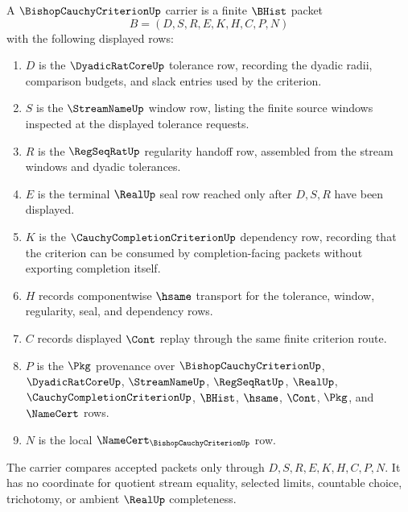 \begin{definition}
\label{def:bishop-cauchy-criterion-carrier}
A $\BishopCauchyCriterionUp$ carrier is a finite $\BHist$ packet
$$
B=(D,S,R,E,K,H,C,P,N)
$$
with the following displayed rows:
\begin{enumerate}
\item $D$ is the $\DyadicRatCoreUp$ tolerance row, recording the dyadic radii, comparison budgets, and slack entries used by the criterion.
\item $S$ is the $\StreamNameUp$ window row, listing the finite source windows inspected at the displayed tolerance requests.
\item $R$ is the $\RegSeqRatUp$ regularity handoff row, assembled from the stream windows and dyadic tolerances.
\item $E$ is the terminal $\RealUp$ seal row reached only after $D,S,R$ have been displayed.
\item $K$ is the $\CauchyCompletionCriterionUp$ dependency row, recording that the criterion can be consumed by completion-facing packets without exporting completion itself.
\item $H$ records componentwise $\hsame$ transport for the tolerance, window, regularity, seal, and dependency rows.
\item $C$ records displayed $\Cont$ replay through the same finite criterion route.
\item $P$ is the $\Pkg$ provenance over $\BishopCauchyCriterionUp$, $\DyadicRatCoreUp$, $\StreamNameUp$, $\RegSeqRatUp$, $\RealUp$, $\CauchyCompletionCriterionUp$, $\BHist$, $\hsame$, $\Cont$, $\Pkg$, and $\NameCert$ rows.
\item $N$ is the local $\NameCert_{\BishopCauchyCriterionUp}$ row.
\end{enumerate}
The carrier compares accepted packets only through $D,S,R,E,K,H,C,P,N$. It has no coordinate for quotient stream equality, selected limits, countable choice, trichotomy, or ambient $\RealUp$ completeness.
\end{definition}

